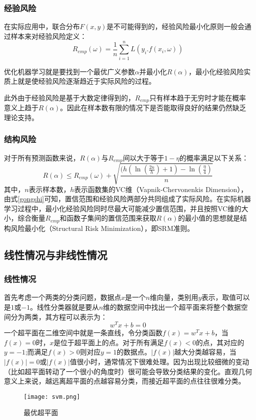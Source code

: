 \subsubsection{经验风险}
在实际应用中，联合分布$F(x,y)$是不可能得到的，经验风险最小化原则一般会通过样本来对经验风险定义：
\begin{equation}
R_{emp}(\omega)=\frac{1}{n}\sum_{i=1}^{n}L(y_{i}.f(x_{i},\omega))
\end{equation}

优化机器学习就是要找到一个最优广义参数$\alpha$并最小化$R(\alpha)$，最小化经验风险实质上就是使经验风险逐渐趋近于实际风险的过程。

此外由于经验风险是基于大数定律得到的，$R_{emp}$只有样本趋于无穷时才能在概率意义上趋于$R(\alpha)$。因此在样本数有限的情况下是否能取得良好的结果仍然缺乏理论支持。

\subsubsection{结构风险}
对于所有预测函数来说，$R(\alpha)$与$R_{emp}$间以大于等于$1-\eta$的概率满足以下关系：
\begin{equation}\label{gongshi}
R(\alpha)\le R_{emp}(\omega)+\sqrt{\frac{(h(\ln(\frac{2n}{h})+1)-\ln(\frac{\eta}{4})}{n}}
\end{equation}
其中，$n$表示样本数，$h$表示函数集的VC维（Vapnik-Chervonenkis Dimension），由式\ref{gongshi}可知，置信范围和经验风险两部分共同组成了实际风险。在实际机器学习过程中，最小化经验风险同时尽最大可能减少置信范围，并且按照VC维的大小，综合衡量$R_{emp}$和函数子集间的置信范围来获取$R(\alpha)$的最小值的思想就是结构风险最小化（Structural Risk Minimization），即SRM准则。

\subsection{线性情况与非线性情况} 
\subsubsection{线性情况} 

首先考虑一个两类的分类问题，数据点$x$是一个$n$维向量，类别用$y$表示，取值可以是$1$或$-1$。线性分类器就是要从$n$维的数据空间中找出一个超平面来将整个数据空间分为两类，其方程可以表示为：
\begin{equation}
w^{T}x+b=0
\end{equation}
一个超平面在二维空间中就是一条直线，令分类函数$f(x)=w^{T}x+b$，当$f(x)=0$时，$x$是位于超平面上的点。对于所有满足$f(x)<0$的点，其对应的$y=-1$;而满足$f(x)>0$则对应$y=1$的数据点。$\vert f(x)\vert$越大分类越容易，当$\vert　f(x)\vert=0$或$\vert　f(x)\vert$值很小时，通常情况下很难处理。因为出现比较细微的变动（比如超平面转动了一个很小的角度时）很可能会导致分类结果的变化。直观几何意义上来说，越远离超平面的点越容易分类，而接近超平面的点往往很难分类。
\begin{figure}[ht!]
   \centering
  \texttt{[image: svm.png]}
  \caption{最优超平面}
    \label{}
 \end{figure}



